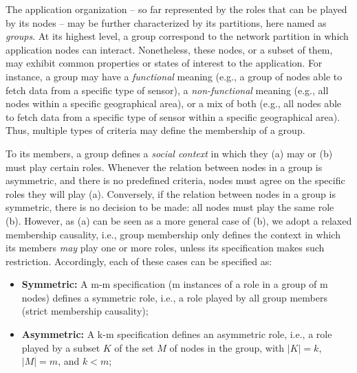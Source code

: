 
The application organization -- so far represented by the roles that can be played by its nodes -- may be further characterized by its partitions, here named as \textit{groups}. 
At its highest level, a group correspond to the network partition in which application nodes can interact. Nonetheless, these nodes, or a subset of them, may exhibit common properties or states of interest to the application. For instance, a group may have a \textit{functional} meaning (e.g., a group of nodes able to fetch data from a specific type of sensor), a \textit{non-functional} meaning (e.g., all nodes within a specific geographical area), or a mix of both (e.g., all nodes able to fetch data from a specific type of sensor within a specific geographical area). Thus, multiple types of criteria may define the membership of a group.

To its members, a group defines a \textit{social context} in which they (a) may or (b) must play certain roles. Whenever the relation between nodes in a group is asymmetric, and there is no predefined criteria, nodes must agree on the specific roles they will play (a). Conversely, if the relation between nodes in a group is symmetric, there is no decision to be made: all nodes must play the same role (b). However, as (a) can be seen as a more general case of (b), we adopt a relaxed membership causality, i.e., group membership only defines the context in which its members \textit{may} play one or more roles, unless its specification makes such restriction. Accordingly, each of these cases can be specified as:

\begin{itemize}
	
	\item \textbf{Symmetric:} A m-m specification (m instances of a role in a group of m nodes) defines a symmetric role, i.e., a role played by all group members (strict membership causality);
	
	\item \textbf{Asymmetric:} A k-m specification defines an asymmetric role, i.e., a role played by a subset $K$ of the set $M$ of nodes in the group, with $|K| = k$, $|M| = m$, and $k < m$;
	
	
\end{itemize}


